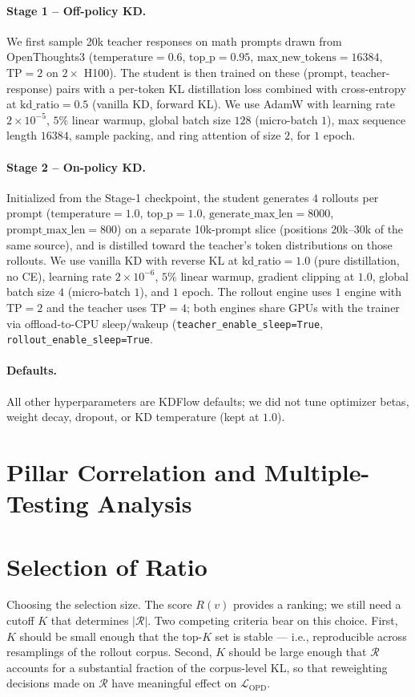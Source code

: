 \documentclass{article}
\begin{document}
\paragraph{Stage 1 -- Off-policy KD.} We first sample 20k teacher responses on math prompts drawn from OpenThoughts3 ($\text{temperature}=0.6$, $\text{top\_p}=0.95$, $\text{max\_new\_tokens}=16384$, $\text{TP}=2$ on $2\times$ H100). The student is then trained on these (prompt, teacher-response) pairs with a per-token KL distillation loss combined with cross-entropy at $\text{kd\_ratio}=0.5$ (vanilla KD, forward KL). We use AdamW with learning rate $2\times10^{-5}$, $5\%$ linear warmup, global batch size $128$ (micro-batch $1$), max sequence length $16384$, sample packing, and ring attention of size $2$, for $1$ epoch.

\paragraph{Stage 2 -- On-policy KD.} Initialized from the Stage-1 checkpoint, the student generates $4$ rollouts per prompt ($\text{temperature}=1.0$, $\text{top\_p}=1.0$, $\text{generate\_max\_len}=8000$, $\text{prompt\_max\_len}=800$) on a separate 10k-prompt slice (positions 20k--30k of the same source), and is distilled toward the teacher's token distributions on those rollouts. We use vanilla KD with reverse KL at $\text{kd\_ratio}=1.0$ (pure distillation, no CE), learning rate $2\times10^{-6}$, $5\%$ linear warmup, gradient clipping at $1.0$, global batch size $4$ (micro-batch $1$), and $1$ epoch. The rollout engine uses $1$ engine with $\text{TP}=2$ and the teacher uses $\text{TP}=4$; both engines share GPUs with the trainer via offload-to-CPU sleep/wakeup (\texttt{teacher\_enable\_sleep=True}, \texttt{rollout\_enable\_sleep=True}.

\paragraph{Defaults.} All other hyperparameters are KDFlow defaults; we did not tune optimizer betas, weight decay, dropout, or KD temperature (kept at $1.0$).


\section{Pillar Correlation and Multiple-Testing Analysis}




\section{Selection of Ratio}
\label{app:rock_ratio}
Choosing the selection size. The score $R(v)$ provides a ranking; we still need a cutoff $K$ that determines $|\mathcal{R}|$. Two competing criteria bear on this choice. First, $K$ should be small enough that the top-$K$ set is stable — i.e., reproducible across resamplings of the rollout corpus. Second, $K$ should be large enough that $\mathcal{R}$ accounts for a substantial fraction of the corpus-level KL, so that reweighting decisions made on $\mathcal{R}$ have meaningful effect on $\mathcal{L}_{\text{OPD}}$.
\end{document}
